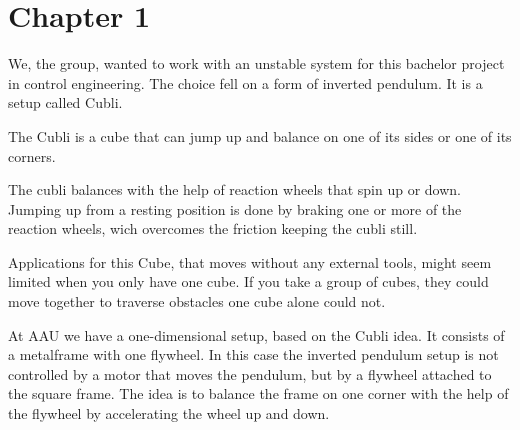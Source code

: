 \chapter{Chapter 1}
We, the group, wanted to work with an unstable system for this bachelor project in control engineering. The choice fell on a form of inverted pendulum. It is a setup called Cubli.

The Cubli is a cube that can jump up and balance on one of its sides or one of its corners.\cite{MGajamohan}

The cubli balances with the help of reaction wheels that spin up or down. Jumping up from a resting position is done by braking one or more of the reaction wheels, wich overcomes the friction keeping the cubli still.

Applications for this Cube, that moves without any external tools, might seem limited when you only have one cube. If you take a group of cubes, they could move together to traverse obstacles one cube alone could not. \cite{JRomanishin}



At AAU we have a one-dimensional setup, based on the Cubli idea. It consists of a metalframe with one flywheel. In this case the inverted pendulum setup is not controlled by a motor that moves the pendulum, but by a flywheel attached to the square frame. The idea is to balance the frame on one corner with the help of the flywheel by accelerating the wheel up and down.


